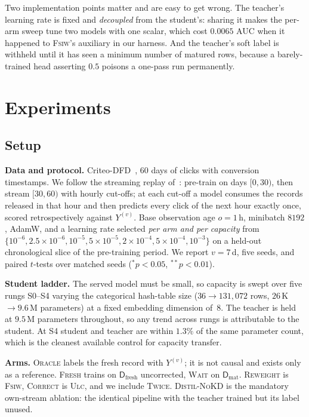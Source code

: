 \documentclass[runningheads]{llncs}
\newcommand{\Yv}{Y^{(v)}}
\begin{document}
Two implementation points matter and are easy to get wrong. The teacher's learning rate is fixed and
\emph{decoupled} from the student's: sharing it makes the per-arm sweep tune two models with one
scalar, which cost $0.0065$ AUC when it happened to \textsc{Fsiw}'s auxiliary in our harness. And
the teacher's soft label is withheld until it has seen a minimum number of matured rows, because a
barely-trained head asserting $0.5$ poisons a one-pass run permanently.

\section{Experiments}\label{sec:experiments}

\subsection{Setup}\label{sec:setup}

\noindent\textbf{Data and protocol.} Criteo-DFD~\cite{chapelle2014modeling}, 60 days of clicks with
conversion timestamps. We follow the streaming replay of~\cite{li2026twice}: pre-train on days
$[0,30)$, then stream $[30,60)$ with hourly cut-offs; at each cut-off a model consumes the records
released in that hour and then predicts every click of the next hour exactly once, scored
retrospectively against $\Yv$. Base observation age $o = 1$\,h, minibatch $8192$, AdamW, and a
learning rate selected \emph{per arm and per capacity} from
$\{10^{-6}, 2.5{\times}10^{-6}, 10^{-5}, 5{\times}10^{-5}, 2{\times}10^{-4}, 5{\times}10^{-4},
10^{-3}\}$ on a held-out chronological slice of the pre-training period. We report $v = 7$\,d, five
seeds, and paired $t$-tests over matched seeds ($^{\ast}p<0.05$, $^{\ast\ast}p<0.01$).

\noindent\textbf{Student ladder.} The served model must be small, so capacity is swept over five
rungs S0--S4 varying the categorical hash-table size ($36 \to 131{,}072$ rows, $26$\,K $\to 9.6$\,M
parameters) at a fixed embedding dimension of~8. The teacher is held at $9.5$\,M parameters
throughout, so any trend across rungs is attributable to the student. At S4 student and teacher are
within $1.3\%$ of the same parameter count, which is the cleanest available control for capacity
transfer.

\noindent\textbf{Arms.} \textsc{Oracle} labels the fresh record with $\Yv$; it is not causal and
exists only as a reference. \textsc{Fresh} trains on $\mathsf{D}_{\text{fresh}}$ uncorrected,
\textsc{Wait} on $\mathsf{D}_{\text{mat}}$. \textsc{Reweight} is \textsc{Fsiw}, \textsc{Correct} is
\textsc{Ulc}, and we include \textsc{Twice}. \textsc{Distil-NoKD} is the mandatory own-stream
ablation: the identical pipeline with the teacher trained but its label unused.
\end{document}
